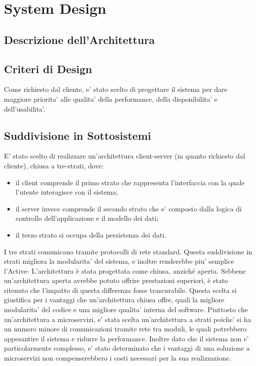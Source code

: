 \chapter{System Design}

\section{Descrizione dell'Architettura}
\section{Criteri di Design}
Come richiesto dal cliente, e' stato scelto di progettare il sistema per dare maggiore priorita' alle qualita' della performance, della disponibilita' e dell'usabilita'.
\section{Suddivisione in Sottosistemi}
E' stato scelto di realizzare un'architettura client-server (in quanto richiesto dal cliente), chiusa a tre-strati, dove:
\begin{itemize}
    \item il client comprende il primo strato che rappresenta l'interfaccia con la quale l'utente interagisce con il sistema; 
    \item il server invece comprende il secondo strato che e' composto dalla logica di controllo dell'applicazione e il modello dei dati; 
    \item il terzo strato si occupa della persistenza dei dati. 
\end{itemize}
I tre strati comunicano tramite protocolli di rete standard.
Questa suddivisione in strati migliora la modularita' del sistema, e inoltre renderebbe piu' semplice l'Active- \newline
L'architettura è stata progettata come chiusa, anziché aperta. Sebbene un'architettura aperta avrebbe potuto offrire prestazioni superiori, è stato ritenuto che l'impatto di questa differenza fosse trascurabile. Questa scelta si giustifica per i vantaggi che un'architettura chiusa offre, quali la migliore modularita' del codice e una migliore qualita' interna del software. \newline
Piuttosto che un'architettura a microservizi, e' stata scelta un'architettura a strati poiche' si ha un numero minore di comunicazioni tramite rete tra moduli, le quali potrebbero appesantire il sistema e ridurre la performance. Inoltre dato che il sistema non e' particolarmente complesso, e' stato determinato che i vantaggi di una soluzione a microservizi non compenserebbero i costi necessari per la sua realizzazione.
